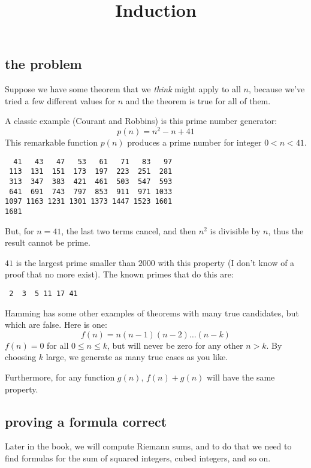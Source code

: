 \documentclass[11pt, oneside]{article}
\title{Induction}
\date{}
\begin{document}
\maketitle
\Large

\label{sec:Induction}

\subsection*{the problem}

Suppose we have some theorem that we \emph{think} might apply to all $n$, because we've tried a few different values for $n$ and the theorem is true for all of them.  

A classic example (Courant and Robbins) is this prime number generator:
\[ p(n) = n^2 - n + 41 \]
This remarkable function $p(n)$ produces a prime number for integer $0 < n < 41$.

\begin{verbatim}
  41   43   47   53   61   71   83   97
 113  131  151  173  197  223  251  281
 313  347  383  421  461  503  547  593
 641  691  743  797  853  911  971 1033
1097 1163 1231 1301 1373 1447 1523 1601
1681
\end{verbatim}

But, for $n=41$, the last two terms cancel, and then $n^2$ is divisible by $n$, thus the result cannot be prime.

$41$ is the largest prime smaller than $2000$ with this property (I don't know of a proof that no more exist).  The known primes that do this are:

\begin{verbatim}
 2  3  5 11 17 41
\end{verbatim}

Hamming has some other examples of theorems with many true candidates, but which are false.  Here is one:
\[ f(n) = n(n-1)(n-2) \dots (n-k) \]
$f(n)=0$ for all $0 \le n \le k$, but will never be zero for any other $n > k$.  By choosing $k$ large, we generate as many true cases as you like.

Furthermore, for any function $g(n)$, $f(n) + g(n)$ will have the same property.

\subsection*{proving a formula correct}

Later in the book, we will compute Riemann sums, and to do that we need to find formulas for the sum of squared integers, cubed integers, and so on.  
\end{document}
